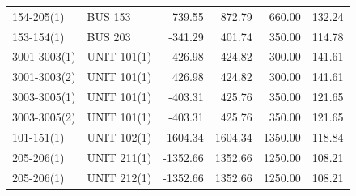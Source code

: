 \documentclass[10pt]{report}
\begin{document}
\begin{table}[H]
{\begin{tabular}{llrrrr}
154-205(1) & BUS 153 & 739.55 & 872.79 & 660.00 & 132.24 \\
153-154(1) & BUS 203 & -341.29 & 401.74 & 350.00 & 114.78 \\
3001-3003(1) & UNIT 101(1) & 426.98 & 424.82 & 300.00 & 141.61 \\
3001-3003(2) & UNIT 101(1) & 426.98 & 424.82 & 300.00 & 141.61 \\
3003-3005(1) & UNIT 101(1) & -403.31 & 425.76 & 350.00 & 121.65 \\
3003-3005(2) & UNIT 101(1) & -403.31 & 425.76 & 350.00 & 121.65 \\
101-151(1) & UNIT 102(1) & 1604.34 & 1604.34 & 1350.00 & 118.84 \\
205-206(1) & UNIT 211(1) & -1352.66 & 1352.66 & 1250.00 & 108.21 \\
205-206(1) & UNIT 212(1) & -1352.66 & 1352.66 & 1250.00 & 108.21 \\
\bottomrule
\end{tabular}}
\end{table}
\end{document}
